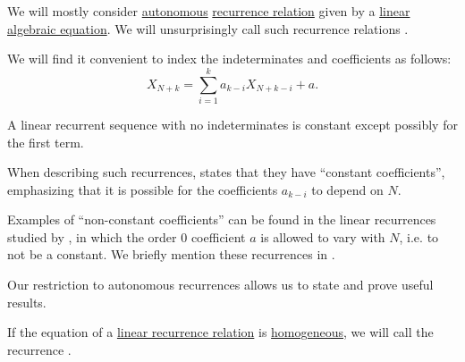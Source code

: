 \begin{definition}\label{def:linear_recurrence}
  We will mostly consider \hyperref[def:recurrence_relation/autonomous]{autonomous} \hyperref[def:recurrence_relation]{recurrence relation} given by a \hyperref[def:polynomial_degree_terminology]{linear} \hyperref[def:algebraic_equation]{algebraic equation}. We will unsurprisingly call such recurrence relations .

  We will find it convenient to index the indeterminates and coefficients as follows:
  \begin{equation}\label{eq:def:linear_recurrence}
    X_{N+k} = \sum_{i=1}^k a_{k-i} X_{N+k-i} + a.
  \end{equation}
\end{definition}
\begin{comments}
  \item A linear recurrent sequence with no indeterminates is constant except possibly for the first term.

  \item When describing such recurrences,  states that they have \enquote{constant coefficients}, emphasizing that it is possible for the coefficients \( a_{k-i} \) to depend on \( N \).

  Examples of \enquote{non-constant coefficients} can be found in the linear recurrences studied by , in which the order \( 0 \) coefficient \( a \) is allowed to vary with \( N \), i.e. to not be a constant. We briefly mention these recurrences in .

  Our restriction to autonomous recurrences allows us to state and prove useful results.
\end{comments}

\begin{definition}\label{def:homogeneous_linear_recurrence}
  If the equation of a \hyperref[def:linear_recurrence]{linear recurrence relation} is \hyperref[def:homogeneous_equation]{homogeneous}, we will call the recurrence .
\end{definition}

